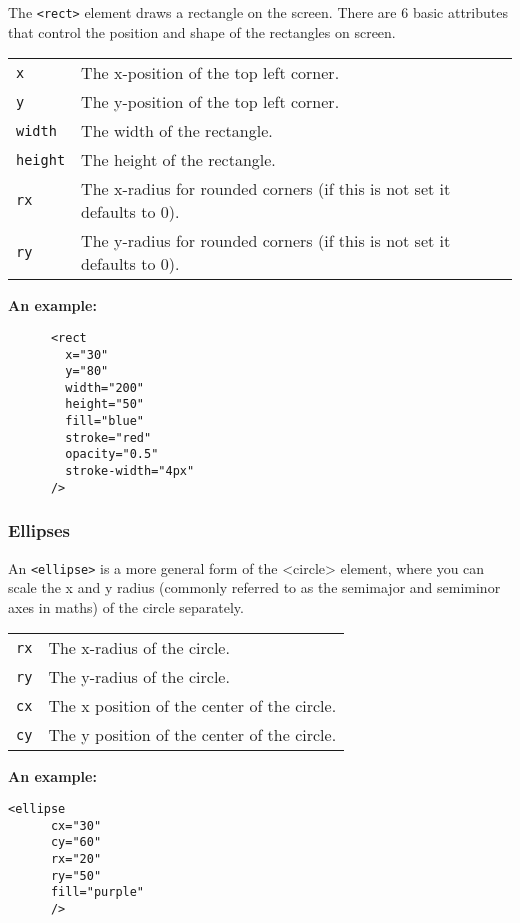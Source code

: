 \documentclass[11pt,a4paper]{report}
\begin{document}
 The \verb|<rect>| element draws a rectangle on the screen. There are 6 basic attributes that control the position and shape of the rectangles on screen. 
 \begin{center}
 \begin{tabular}{l|p{15cm}}
\verb|x| & The x-position of the top left corner. \\
\verb|y| & The y-position of the top left corner. \\
\verb|width| & The width of the rectangle. \\
\verb|height| & The height of the rectangle.  \\
\verb|rx| & The x-radius for rounded corners (if this is not set it defaults to 0). \\
\verb|ry| & The y-radius for rounded corners (if this is not set it defaults to 0).
\end{tabular}
\end{center}

{\bf An example:}
\begin{multicols}{2}
\begin{lstlisting}
      <rect
        x="30"
        y="80"
        width="200"
        height="50"
        fill="blue"
        stroke="red"
        opacity="0.5"
        stroke-width="4px"
      />
\end{lstlisting}
\columnbreak

\end{multicols}


\newpage
\subsubsection{Ellipses}

An \verb|<ellipse>| is a more general form of the <circle> element, where you can scale the x and y radius (commonly referred to as the semimajor and semiminor axes in maths) of the circle separately.
\begin{center}
\begin{tabular}{l|p{15cm}}
\verb|rx| & The x-radius of the circle. \\
\verb|ry| & The y-radius of the circle. \\
\verb|cx| & The x position of the center of the circle. \\
\verb|cy| & The y position of the center of the circle. 
\end{tabular}
\end{center}

{\bf An example:}
\begin{multicols}{2}
\begin{lstlisting}
<ellipse 
      cx="30"
      cy="60"
      rx="20"
      ry="50"
      fill="purple"
      />
\end{lstlisting}
\columnbreak

\end{multicols}
\end{document}
